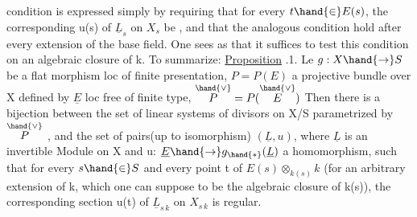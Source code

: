 
condition is expressed simply by requiring that for every $t\hand{\in} E(s)$,
the corresponding  u(s) of $\underline{L}_s$ on $X_s$ be , and that the
analogous condition hold after every extension of the base field.
One sees as  that it suffices to test this condition on an
algebraic closure of k. To summarize:
\uline{Proposition} .1. Le $g:X\hand{\to} S$ be a flat morphism loc of finite
presentation, $P=P(E)$ a projective bundle over X defined by $\underline{E}$ loc free of finite
type, $\overset{\hand{\vee}}{P} = P(\overset{\hand{\vee}}{E})$ \hand{,} Then there is a bijection between
the set of linear systems of divisors on X/S parametrized by $\overset{\hand{\vee}}{P}$ ,
and the set of pairs(up to isomorphism) $(\underline{L},u)$, where $\underline{L}$ is an
invertible Module on X and u: $\underline{E}\hand{\to} g_{\hand{*}}(\underline{L})$ a homomorphism, such that
for every $s\hand{\in} S$ and every point t of $E(s)\otimes_{k(s)}k$ (for an arbitrary
 extension of k, which one can suppose to be the algebraic closure of k(s)),
the corresponding section u(t) of $\underline{L}_{s\,k}$ on $X_{s\,k}$ is regular.

